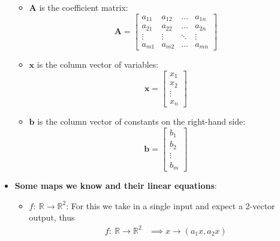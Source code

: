 \documentclass{report}
\begin{document}
\begin{itemize}
\begin{itemize}
                 \item \(\mathbf{A}\) is the coefficient matrix:
                     \[
                         \mathbf{A} = 
                         \begin{bmatrix}
                             a_{11} & a_{12} & \dots & a_{1n} \\
                             a_{21} & a_{22} & \dots & a_{2n} \\
                             \vdots & \vdots & \ddots & \vdots \\
                             a_{m1} & a_{m2} & \dots & a_{mn}
                         \end{bmatrix}
                     \]
                 \item \(\mathbf{x}\) is the column vector of variables:
                     \[
                         \mathbf{x} = 
                         \begin{bmatrix}
                             x_1 \\
                             x_2 \\
                             \vdots \\
                             x_n
                         \end{bmatrix}
                     \]
                 \item \(\mathbf{b}\) is the column vector of constants on the right-hand side:
                     \[
                         \mathbf{b} = 
                         \begin{bmatrix}
                             b_1 \\
                             b_2 \\
                             \vdots \\
                             b_m
                         \end{bmatrix}
                     \]
             \end{itemize}
            \item \textbf{Some maps we know and their linear equations}:
                \begin{itemize}
                    \item \textbf{$f:\ \mathbb{R} \to \mathbb{R}^{2}$}: For this we take in a single input and expect a 2-vector output, thus
                        \begin{align*}
                            f:\ \mathbb{R} \to \mathbb{R}^{2} &\implies x \to (a_{1}x, a_{2}x) \\

\end{align*}
\end{itemize}
\end{itemize}
\end{document}

